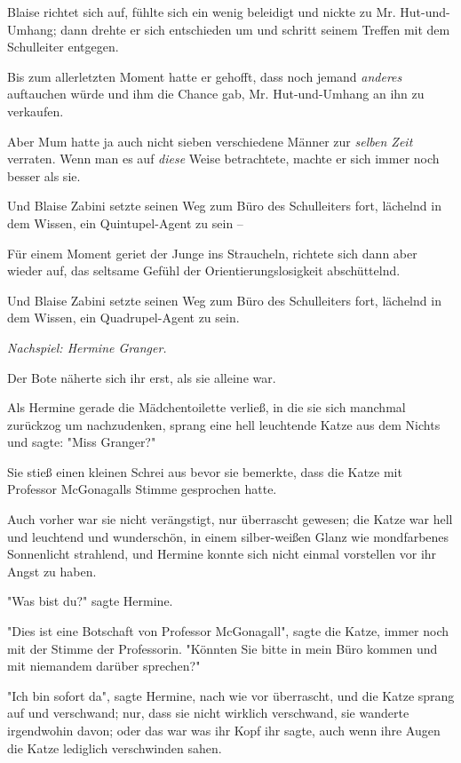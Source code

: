 {Blaise richtet sich auf, fühlte sich ein wenig beleidigt und nickte zu Mr. Hut-und-Umhang; dann drehte er sich entschieden um und schritt seinem Treffen mit dem Schulleiter entgegen.

Bis zum allerletzten Moment hatte er gehofft, dass noch jemand \emph{anderes} auftauchen würde und ihm die Chance gab, Mr. Hut-und-Umhang an ihn zu verkaufen.

Aber Mum hatte ja auch nicht sieben verschiedene Männer zur \emph{selben Zeit} verraten. Wenn man es auf \emph{diese} Weise betrachtete, machte er sich immer noch besser als sie.

Und Blaise Zabini setzte seinen Weg zum Büro des Schulleiters fort, lächelnd in dem Wissen, ein Quintupel-Agent zu sein --

Für einem Moment geriet der Junge ins Straucheln, richtete sich dann aber wieder auf, das seltsame Gefühl der Orientierungslosigkeit abschüttelnd.

Und Blaise Zabini setzte seinen Weg zum Büro des Schulleiters fort, lächelnd in dem Wissen, ein Quadrupel-Agent zu sein.

\emph{Nachspiel: Hermine Granger.}

Der Bote näherte sich ihr erst, als sie alleine war.

Als Hermine gerade die Mädchentoilette verließ, in die sie sich manchmal zurückzog um nachzudenken, sprang eine hell leuchtende Katze aus dem Nichts und sagte: "Miss Granger?"

Sie stieß einen kleinen Schrei aus bevor sie bemerkte, dass die Katze mit Professor McGonagalls Stimme gesprochen hatte.

Auch vorher war sie nicht verängstigt, nur überrascht gewesen; die Katze war hell und leuchtend und wunderschön, in einem silber-weißen Glanz wie mondfarbenes Sonnenlicht strahlend, und Hermine konnte sich nicht einmal vorstellen vor ihr Angst zu haben.

"Was bist du?" sagte Hermine.

"Dies ist eine Botschaft von Professor McGonagall", sagte die Katze, immer noch mit der Stimme der Professorin. "Könnten Sie bitte in mein Büro kommen und mit niemandem darüber sprechen?"

"Ich bin sofort da", sagte Hermine, nach wie vor überrascht, und die Katze sprang auf und verschwand; nur, dass sie nicht wirklich verschwand, sie wanderte irgendwohin davon; oder das war was ihr Kopf ihr sagte, auch wenn ihre Augen die Katze lediglich verschwinden sahen.

}
